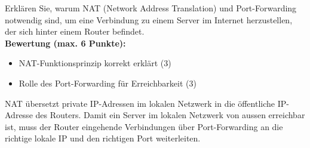 \begin{myexercise}

    Erklären Sie, warum NAT (Network Address Translation) und Port-Forwarding notwendig sind, um eine Verbindung zu einem Server im Internet herzustellen, der sich hinter einem Router befindet.
    \\[.5cm]
    \textbf{Bewertung (max. 6 Punkte):}
    \begin{itemize}
        \item NAT-Funktionsprinzip korrekt erklärt (3)
        \item Rolle des Port-Forwarding für Erreichbarkeit (3)
    \end{itemize}

    \begin{myanswer}
        NAT übersetzt private IP-Adressen im lokalen Netzwerk in die öffentliche IP-Adresse des Routers. Damit ein Server im lokalen Netzwerk von aussen erreichbar ist, muss der Router eingehende Verbindungen über Port-Forwarding an die richtige lokale IP und den richtigen Port weiterleiten.
    \end{myanswer}
\end{myexercise}